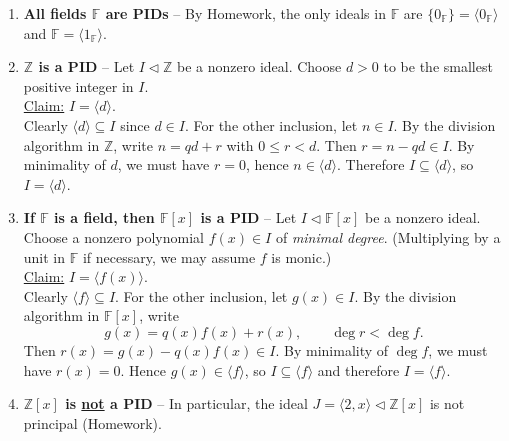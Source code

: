 \begin{example}\hfill
\begin{enumerate}
    \item {\bf All fields $\mathbb{F}$ are PIDs} -- By Homework, the only ideals in $\mathbb{F}$ are $\{0_{\mathbb{F}}\} = \langle 0_{\mathbb{F}} \rangle$ and $\mathbb{F} = \langle 1_{\mathbb{F}} \rangle$.
    \item \textbf{$\mathbb{Z}$ is a PID} -- Let $I \triangleleft \mathbb{Z}$ be a nonzero ideal. Choose $d>0$ to be the smallest positive integer in $I$. \\
    \underline{Claim:} $I=\langle d\rangle$. \\
    Clearly $\langle d\rangle \subseteq I$ since $d\in I$. For the other inclusion, let $n\in I$.
    By the division algorithm in $\mathbb{Z}$, write $n=qd+r$ with $0\le r<d$.
    Then $r=n-qd\in I$. By minimality of $d$, we must have $r=0$, hence $n\in \langle d\rangle$.
    Therefore $I\subseteq \langle d\rangle$, so $I=\langle d\rangle$.

    \item \textbf{If $\mathbb{F}$ is a field, then $\mathbb{F}[x]$ is a PID} -- Let $I\triangleleft \mathbb{F}[x]$ be a nonzero ideal. Choose a nonzero polynomial $f(x)\in I$ of \emph{minimal degree}.
    (Multiplying by a unit in $\mathbb{F}$ if necessary, we may assume $f$ is monic.) \\
    \underline{Claim:} $I=\langle f(x)\rangle$. \\
    Clearly $\langle f\rangle\subseteq I$. For the other inclusion, let $g(x)\in I$.
    By the division algorithm in $\mathbb{F}[x]$, write
    \[
    g(x)=q(x)f(x)+r(x),\qquad \deg r < \deg f.
    \]
    Then $r(x)=g(x)-q(x)f(x)\in I$. By minimality of $\deg f$, we must have $r(x)=0$.
    Hence $g(x)\in \langle f\rangle$, so $I\subseteq \langle f\rangle$ and therefore $I=\langle f\rangle$.

    \item \textbf{$\mathbb{Z}[x]$ is \underline{not} a PID} --
    In particular, the ideal $J=\langle 2,x\rangle \triangleleft \mathbb{Z}[x]$ is not principal (Homework). %
\end{enumerate}
\end{example}

